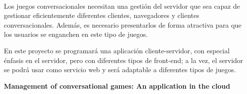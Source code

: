 \chapter*{}






\cleardoublepage
\thispagestyle{empty}

\begin{center}
{\large\bfseries \myTitle}\\
\end{center}
\begin{center}
\myName\\
\end{center}

\\

\vspace{0.7cm}
\\

Los juegos conversacionales necesitan una gestión del servidor que sea capaz de gestionar eficientemente diferentes clientes, navegadores y clientes conversacionales. Además, es necesario presentarlos de forma atractiva para que los usuarios se enganchen en este tipo de juegos.

En este proyecto se programará una aplicación cliente-servidor, con especial énfasis en el servidor, pero con diferentes tipos de front-end; a la vez, el servidor se podrá usar como servicio web y será adaptable a diferentes tipos de juegos.
\cleardoublepage


\thispagestyle{empty}


\begin{center}
{\large\bfseries Management of conversational games: An application in the cloud}\\
\end{center}
\begin{center}
\myName\\
\end{center}

\\

